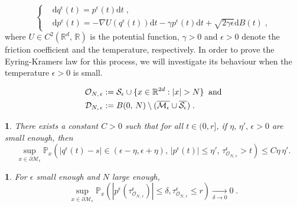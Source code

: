 \documentclass[10pt,a4paper]{amsart}
\newtheorem{cor}{}
\newtheorem{lem}{}
\newcommand{\M}{\mathcal{M}}
\begin{document}
\begin{equation}
\left\{ \begin{aligned} & \mathrm{d}q^{\epsilon}(t)=p^{\epsilon}(t)\mathrm{d}t\;,\\
 & \mathrm{d}p^{\epsilon}(t)=-\nabla U(q^{\epsilon}(t))\mathrm{d}t-\gamma p^{\epsilon}(t)\mathrm{d}t+\sqrt{2\gamma\epsilon}\mathrm{d}B(t)\;,
\end{aligned}
\right.\label{eq:sde}
\end{equation}
where $U\in C^{2}(\mathbb{R}^{d},\mathbb{\,R})$ is the potential function,
$\gamma>0$ and $\epsilon>0$ denote the friction coefficient and
the temperature, respectively. In order to prove the Eyring-Kramers law for this process, we will investigate its behaviour when the temperature
$\epsilon>0$ is small.

\begin{align}
\mathcal{O}_{N,\,\epsilon} & :=\mathcal{S}_{\epsilon}\cup\{x\in\mathbb{R}^{2d}:|x|>N\}\;\;\text{and}\label{eq:definition O_N}\\
\mathcal{D}_{N,\,\epsilon} & :=\textup{B}(0,\,N)\setminus(\overline{\mathcal{M}_{\epsilon}}\cup\overline{\mathcal{S}_{\epsilon}})\;.\nonumber 
\end{align}

\begin{cor}\label{cor:weyl density}
There exists a constant $C>0$ such that for all $t\in(0,r]$, if $\eta,\,\eta',\,\epsilon>0$ are small enough, then
$$\sup_{x\in\partial\M_\epsilon}\mathbb{P}_{x}\left(\big|q^{\epsilon}(t)-s\big|\in(\epsilon-\eta,\epsilon+\eta),\,\big|p^{\epsilon}(t)\big|\leq\eta',\,\tau_{\mathcal{O}_{N,\,\epsilon}}^{\epsilon}>t\right)\leq C\eta\,\eta'.$$
\end{cor}

\begin{lem}
\label{lem:control inward velocity} For $\epsilon$ small enough
and $N$ large enough, 
\[
\sup_{x\in\partial\mathcal{M}_{\epsilon}}\mathbb{P}_{x}\left(|p^{\epsilon}(\tau_{\mathcal{O}_{N,\,\epsilon}}^{\epsilon})|\leq\delta,\tau_{\mathcal{O}_{N,\,\epsilon}}^{\epsilon}\leq r\right)\underset{\delta\rightarrow0}{\longrightarrow}0\;.
\]
\end{lem}
\end{document}
